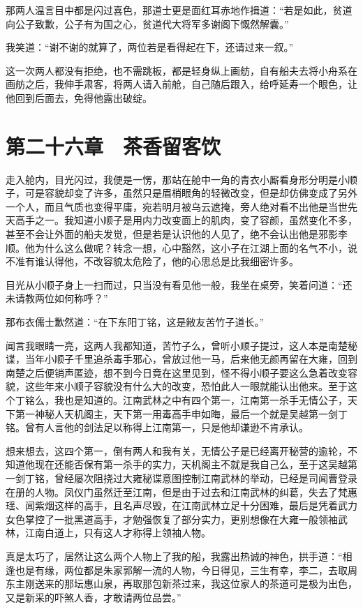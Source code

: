 那两人温言目中都是闪过喜色，那道士更是面红耳赤地作揖道：“若是如此，贫道向公子致歉，公子有为国之心，贫道代大将军多谢阁下慨然解囊。”

我笑道：“谢不谢的就算了，两位若是看得起在下，还请过来一叙。”

这一次两人都没有拒绝，也不需跳板，都是轻身纵上画舫，自有船夫去将小舟系在画舫之后，我伸手肃客，将两人请入前舱，自己随后跟入，给呼延寿一个眼色，让他回到后面去，免得他露出破绽。

\chapter{第二十六章　茶香留客饮}

走入舱内，目光闪过，我便是一愣，那站在舱中一角的青衣小厮看身形分明是小顺子，可是容貌却变了许多，虽然只是眉梢眼角的轻微改变，但是却仿佛变成了另外一个人，而且气质也变得平庸，宛若明月被乌云遮掩，旁人绝对看不出他是当世先天高手之一。我知道小顺子是用内力改变面上的肌肉，变了容颜，虽然变化不多，甚至不会让外面的船夫发觉，但是若是认识他的人见了，绝不会认出他是邪影李顺。他为什么这么做呢？转念一想，心中豁然，这小子在江湖上面的名气不小，说不准有谁认得他，不改容貌太危险了，他的心思总是比我细密许多。

目光从小顺子身上一扫而过，只当没有看见他一般，我坐在桌旁，笑着问道：“还未请教两位如何称呼？”

那布衣儒士歉然道：“在下东阳丁铭，这是敝友苦竹子道长。”

闻言我眼睛一亮，这两人我都知道，苦竹子么，曾听小顺子提过，这人本是南楚秘谍，当年小顺子千里追杀毒手邪心，曾放过他一马，后来他无颜再留在大雍，回到南楚之后便销声匿迹，想不到今日竟在这里见到，怪不得小顺子要这么急着改变容貌，这些年来小顺子容貌没有什么大的改变，恐怕此人一眼就能认出他来。至于这个丁铭么，我也是知道的。江南武林之中有四个第一，江南第一杀手无情公子，天下第一神秘人天机阁主，天下第一用毒高手申如晦，最后一个就是吴越第一剑丁铭。曾有人言他的剑法足以称得上江南第一，只是他却谦逊不肯承认。

想来想去，这四个第一，倒有两人和我有关，无情公子是已经离开秘营的逾轮，不知道他现在还能否保有第一杀手的实力，天机阁主不就是我自己么，至于这吴越第一剑丁铭，曾经屡次阻挠过大雍秘谍意图控制江南武林的举动，已经是司闻曹登录在册的人物。凤仪门虽然迁至江南，但是由于过去和江南武林的纠葛，失去了梵惠瑶、闻紫烟这样的高手，且名声尽毁，在江南武林立足十分困难，最后是凭着武力女色掌控了一批黑道高手，才勉强恢复了部分实力，更别想像在大雍一般领袖武林，江南白道上，只有这人才称得上领袖人物。

真是太巧了，居然让这么两个人物上了我的船，我露出热诚的神色，拱手道：“相逢也是有缘，两位都是朱家郭解一流的人物，今日得见，三生有幸，李二，去取周东主刚送来的那坛惠山泉，再取那包新茶过来，我这位家人的茶道可是极为出色，又是新采的吓煞人香，才敢请两位品尝。”

